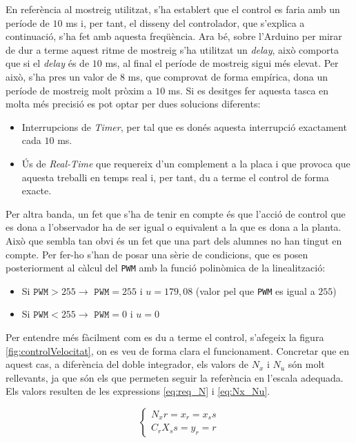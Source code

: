 \documentclass[12pt,a4paper,final,twoside,openright]{report}
\begin{document}
En referència al mostreig utilitzat, s'ha establert que el control es faria amb un període de $10$ ms i, per tant, el disseny del controlador, que s'explica a continuació, s'ha fet amb aquesta freqüència. Ara bé, sobre l'Arduino per mirar de dur a terme aquest ritme de mostreig s'ha utilitzat un \textit{delay}, això comporta que si el \textit{delay} és de $10$ ms, al final el període de mostreig sigui més elevat. Per això, s'ha pres un valor de $8$ ms, que comprovat de forma empírica, dona un període de mostreig molt pròxim a $10$ ms. Si es desitges fer aquesta tasca en molta més precisió es pot optar per dues solucions diferents:

\begin{itemize}
\item Interrupcions de \textit{Timer}, per tal que es donés aquesta interrupció exactament cada $10$ ms.

\item Ús de \textit{Real-Time} que requereix d'un complement a la placa i que provoca que aquesta treballi en temps real i, per tant, du a terme el control de forma exacte.
\end{itemize}

Per altra banda, un fet que s'ha de tenir en compte és que l'acció de control que es dona a l'observador ha de ser igual o equivalent a la que es dona a la planta. Això que sembla tan obvi és un fet que una part dels alumnes no han tingut en compte. Per fer-ho s'han de posar una sèrie de condicions, que es posen posteriorment al càlcul del \texttt{PWM} amb la funció polinòmica de la linealització:

\begin{itemize}
\item Si $\mathtt{PWM} > 255 \rightarrow$ $\mathtt{PWM} = 255$ i $u = 179,08$ (valor pel que \texttt{PWM} es igual a $255$)
\item Si $\mathtt{PWM} < 255 \rightarrow$ $\mathtt{PWM} = 0$ i $u = 0$
\end{itemize}

Per entendre més fàcilment com es du a terme el control, s'afegeix la figura \ref{fig:controlVelocitat}, on es veu de forma clara el funcionament. Concretar que en aquest cas, a diferència del doble integrador, els valors de $N_x$ i $N_u$ són molt rellevants, ja que són els que permeten seguir la referència en l'escala adequada. Els valors resulten de les expressions \eqref{eq:req_N} i \eqref{eq:Nx_Nu}. 

\begin{equation}\label{eq:req_N}
\left\{
\begin{array}{lr}
N_x r = x_r = x_ss \\
C_r X_ss = y_r = r
\end{array}
\right.
\end{equation}
\end{document}
